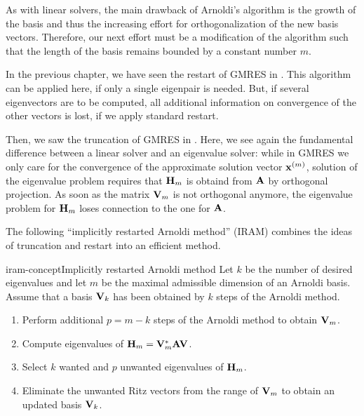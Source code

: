 \begin{intro}
  As with linear solvers, the main drawback of Arnoldi's algorithm is
  the growth of the basis and thus the increasing effort for
  orthogonalization of the new basis vectors. Therefore, our next
  effort must be a modification of the algorithm such that the length
  of the basis remains bounded by a constant number $m$.

  In the previous chapter, we have seen the restart of GMRES in
  . This algorithm can be applied
  here, if only a single eigenpair is needed. But, if several
  eigenvectors are to be computed, all additional information on
  convergence of the other vectors is lost, if we apply standard
  restart.

  Then, we saw the truncation of GMRES in
  . Here, we see again the
  fundamental difference between a linear solver and an eigenvalue
  solver: while in GMRES we only care for the convergence of the
  approximate solution vector $\mathbf x^{(m)}$, solution of the eigenvalue
  problem requires that $\mathbf H_m$ is obtaind from $\mathbf A$ by
  orthogonal projection. As soon as the matrix $\mathbf V_m$ is not
  orthogonal anymore, the eigenvalue problem for $\mathbf H_m$ loses
  connection to the one for $\mathbf A$.

  The following ``implicitly restarted Arnoldi method'' (IRAM) combines the
  ideas of truncation and restart into an efficient method.
\end{intro}

\begin{Algorithm*}{iram-concept}{Implicitly restarted Arnoldi method}
  Let $k$ be the number of desired eigenvalues and let $m$ be the
  maximal admissible dimension of an Arnoldi basis.  Assume that a
  basis $\mathbf V_k$ has been obtained by $k$ steps of the Arnoldi
  method.
  \begin{enumerate}
  \item Perform additional $p=m-k$ steps of the Arnoldi method to
    obtain $\mathbf V_m$.
  \item Compute eigenvalues of $\mathbf H_m = \mathbf V_m^*\mathbf A\mathbf V$.
  \item Select $k$ wanted and $p$ unwanted eigenvalues of $\mathbf H_m$.
  \item Eliminate the unwanted Ritz vectors from the range of
    $\mathbf V_m$ to obtain an updated basis $\mathbf V_k$.
  \end{enumerate}
\end{Algorithm*}



